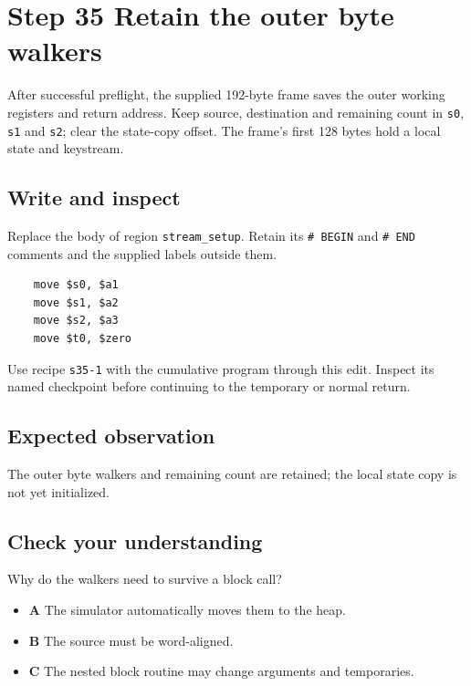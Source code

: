 \section{Step 35 Retain the outer byte walkers}\label{chacha-s35}

After successful preflight, the supplied 192-byte frame saves the outer working registers and return address. Keep source, destination and remaining count in \texttt{s0}, \texttt{s1} and \texttt{s2}; clear the state-copy offset. The frame's first 128 bytes hold a local state and keystream.

\subsection{Write and inspect}
Replace the body of region \texttt{stream\_setup}. Retain its \texttt{\# BEGIN} and \texttt{\# END} comments and the supplied labels outside them.

\begin{verbatim}
    move $s0, $a1
    move $s1, $a2
    move $s2, $a3
    move $t0, $zero
\end{verbatim}

Use recipe \texttt{s35-1} with the cumulative program through this edit. Inspect its named checkpoint before continuing to the temporary or normal return.

\subsection{Expected observation}
The outer byte walkers and remaining count are retained; the local state copy is not yet initialized.

\subsection{Check your understanding}
Why do the walkers need to survive a block call?

\begin{itemize}
\item \textbf{A} The simulator automatically moves them to the heap.
\item \textbf{B} The source must be word-aligned.
\item \textbf{C} The nested block routine may change arguments and temporaries.
\end{itemize}
